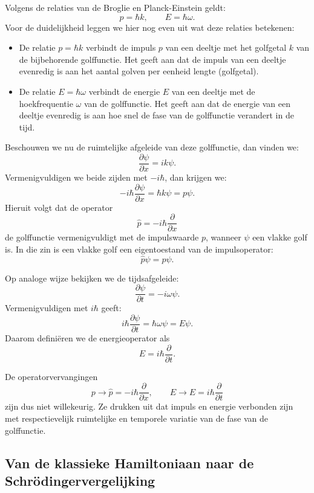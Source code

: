 \documentclass{report} %
\begin{document}
    Volgens de relaties van de Broglie en Planck-Einstein geldt:
    \[
        p=\hbar k,
        \qquad
        E=\hbar\omega.
    \]
    Voor de duidelijkheid leggen we hier nog even uit wat deze relaties betekenen:
    \begin{itemize}
        \item De relatie \(p = \hbar k\) verbindt de impuls \(p\) van een deeltje met het golfgetal \(k\) van de bijbehorende golffunctie. Het geeft aan dat de impuls van een deeltje evenredig is aan het aantal golven per eenheid lengte (golfgetal).
        \item De relatie \(E = \hbar \omega\) verbindt de energie \(E\) van een deeltje met de hoekfrequentie \(\omega\) van de golffunctie. Het geeft aan dat de energie van een deeltje evenredig is aan hoe snel de fase van de golffunctie verandert in de tijd.
    \end{itemize}

    Beschouwen we nu de ruimtelijke afgeleide van deze golffunctie, dan vinden we:
    \[
        \frac{\partial \psi}{\partial x}
        =
        ik\psi.
    \]
    Vermenigvuldigen we beide zijden met \(-i\hbar\), dan krijgen we:
    \[
        -i\hbar \frac{\partial \psi}{\partial x}
        =
        \hbar k \psi
        =
        p\psi.
    \]
    Hieruit volgt dat de operator
    \[
        \hat{p}=-i\hbar \frac{\partial}{\partial x}
    \]
    de golffunctie vermenigvuldigt met de impulswaarde \(p\), wanneer \(\psi\) een
    vlakke golf is. In die zin is een vlakke golf een eigentoestand van de
    impulsoperator:
    \[
        \hat{p}\psi=p\psi.
    \]

    Op analoge wijze bekijken we de tijdsafgeleide:
    \[
        \frac{\partial \psi}{\partial t}
        =
        -i\omega\psi.
    \]
    Vermenigvuldigen met \(i\hbar\) geeft:
    \[
        i\hbar\frac{\partial \psi}{\partial t}
        =
        \hbar\omega\psi
        =
        E\psi.
    \]
    Daarom definiëren we de energieoperator als
    \[
        \hat{E}=i\hbar\frac{\partial}{\partial t}.
    \]

    De operatorvervangingen
    \[
        p \longrightarrow \hat{p}=-i\hbar\frac{\partial}{\partial x},
        \qquad
        E \longrightarrow \hat{E}=i\hbar\frac{\partial}{\partial t}
    \]
    zijn dus niet willekeurig. Ze drukken uit dat impuls en energie verbonden zijn
    met respectievelijk ruimtelijke en temporele variatie van de fase van de
    golffunctie.

    \subsection{Van de klassieke Hamiltoniaan naar de Schrödingervergelijking}
\end{document}
